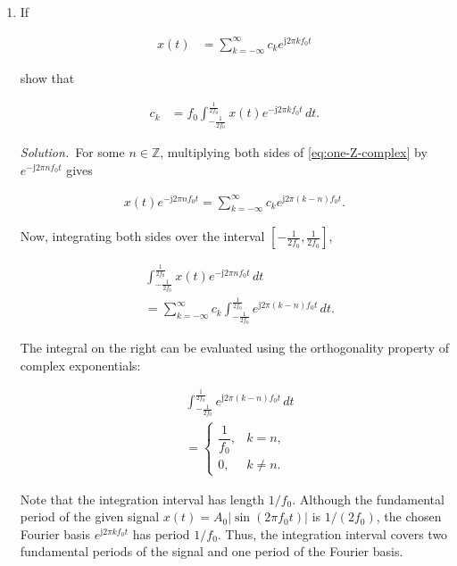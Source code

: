 \documentclass[journal,12pt,twocolumn]{IEEEtran}
\renewcommand\thesection{\arabic{section}}
\newcommand{\jj}{\mathrm{j}}
\providecommand{\solution}{\par\noindent\textit{Solution.}\ }
\begin{document}
\begin{enumerate}[
    label=\thesection.\arabic*,
    ref=\thesection.\theenumi
]

\item If

\begin{align}
    x(t)
    &= \sum_{k=-\infty}^{\infty}
    c_ke^{\jj2\pi kf_0t}
    \label{eq:one-Z-complex}
\end{align}

show that

\begin{align}
    c_k
    &= f_0\int_{-\frac{1}{2f_0}}^{\frac{1}{2f_0}}
    x(t)e^{-\jj2\pi kf_0t}\,dt.
    \label{eq:one-Z}
\end{align}

\solution For some $n\in\mathbb{Z}$, multiplying
both sides of \eqref{eq:one-Z-complex} by
$e^{-\jj2\pi nf_0t}$ gives

\begin{align}
    x(t)e^{-\jj2\pi nf_0t}
    =
    \sum_{k=-\infty}^{\infty}
    c_ke^{\jj2\pi(k-n)f_0t}.
\end{align}

Now, integrating both sides over the interval
$\left[-\frac{1}{2f_0},\frac{1}{2f_0}\right]$,

\begin{align}
    &\int_{-\frac{1}{2f_0}}^{\frac{1}{2f_0}}
    x(t)e^{-\jj2\pi nf_0t}\,dt
    \nonumber\\
    &=
    \sum_{k=-\infty}^{\infty}
    c_k
    \int_{-\frac{1}{2f_0}}^{\frac{1}{2f_0}}
    e^{\jj2\pi(k-n)f_0t}\,dt.
\end{align}

The integral on the right can be evaluated using the
orthogonality property of complex exponentials:

\begin{align}
    &\int_{-\frac{1}{2f_0}}^{\frac{1}{2f_0}}
    e^{\jj2\pi(k-n)f_0t}\,dt
    \nonumber\\
    &=
    \begin{cases}
        \dfrac{1}{f_0}, & k=n,\\[4pt]
        0, & k\neq n.
    \end{cases}
\end{align}

Note that the integration interval has length $1/f_0$.
Although the fundamental period of the given signal
$x(t)=A_0|\sin(2\pi f_0t)|$ is $1/(2f_0)$, the chosen
Fourier basis $e^{\jj2\pi kf_0t}$ has period $1/f_0$. Thus, the integration interval covers two fundamental periods of the signal and one period of the Fourier basis.


\end{enumerate}
\end{document}
